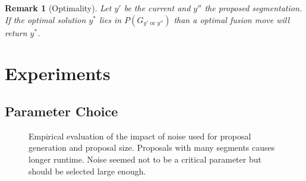 \documentclass[10pt,twocolumn,letterpaper]{article}
\newtheorem{remark}{Remark}
\newcommand{\OR}{\textrm{ or }}
\begin{document}
\begin{remark}[Optimality]
Let $y'$ be the current and $y''$ the proposed segmentation.
If the optimal solution $y^*$ lies in $P(G_{y' \OR y''})$ than a optimal fusion move will return $y^*$.
\end{remark}



\section{Experiments}

\subsection{Parameter Choice}
\begin{figure}
\centering
{}
\caption{Empirical evaluation of the impact of noise used for proposal generation and proposal size.
  Proposals with many segments causes longer runtime. Noise seemed not to be a critical parameter but should be selected large enough.
}
\end{figure}
\end{document}
